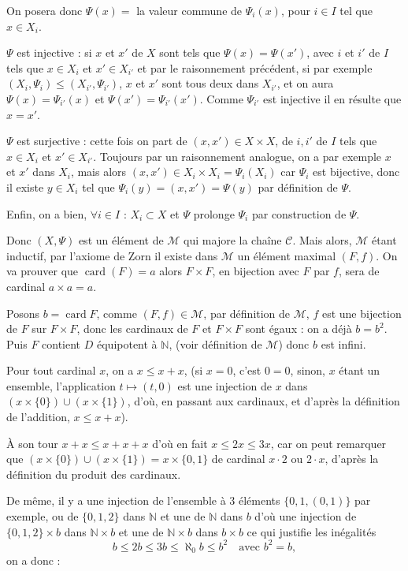 On posera donc $\Psi(x)=$ la valeur commune de $\Psi_i(x)$, pour $i\in I$ tel que $x\in X_i$.

$\Psi$ est injective : si $x$ et $x'$ de $X$ sont tels que $\Psi(x)=\Psi(x')$, avec $i$ et $i'$ de $I$ tels que $x\in X_i$ et $x'\in X_{i'}$ et par le raisonnement précédent, si par exemple $(X_i,\Psi_i)\le(X_{i'},\Psi_{i'})$, $x$ et $x'$ sont tous deux dans $X_{i'}$, et on aura $\Psi(x)=\Psi_{i'}(x)$ et $\Psi(x')=\Psi_{i'}(x')$. Comme $\Psi_{i'}$ est injective il en résulte que $x=x'$.

$\Psi$ est surjective : cette fois on part de $(x,x')\in X\times X$, de $i,i'$ de $I$ tels que $x\in X_i$ et $x'\in X_{i'}$. Toujours par un raisonnement analogue, on a par exemple $x$ et $x'$ dans $X_i$, mais alors $(x,x')\in X_i\times X_i=\Psi_i(X_i)$ car $\Psi_i$ est bijective, donc il existe $y\in X_i$ tel que $\Psi_i(y)=(x,x')=\Psi(y)$ par définition de $\Psi$.

Enfin, on a bien, $\forall i\in I$ : $X_i\subset X$ et $\Psi$ prolonge $\Psi_i$ par construction de $\Psi$.

Donc $(X,\Psi)$ est un élément de $\mathcal M$ qui majore la chaîne $\mathcal C$. Mais alors, $\mathcal M$ étant inductif, par l'axiome de Zorn il existe dans $\mathcal M$ un élément maximal $(F,f)$. On va prouver que $\operatorname{card}(F)=a$ alors $F\times F$, en bijection avec $F$ par $f$, sera de cardinal $a\times a=a$.

Posons $b=\operatorname{card}F$, comme $(F,f)\in\mathcal M$, par définition de $\mathcal M$, $f$ est une bijection de $F$ sur $F\times F$, donc les cardinaux de $F$ et $F\times F$ sont égaux : on a déjà $b=b^2$. Puis $F$ contient $D$ équipotent à $\mathbb N$, (voir définition de $\mathcal M$) donc $b$ est infini.

Pour tout cardinal $x$, on a $x\le x+x$, (si $x=0$, c'est $0=0$, sinon, $x$ étant un ensemble, l'application $t\mapsto(t,0)$ est une injection de $x$ dans $(x\times\{0\})\cup(x\times\{1\})$, d'où, en passant aux cardinaux, et d'après la définition de l'addition, $x\le x+x$).

À son tour $x+x\le x+x+x$ d'où en fait $x\le2x\le3x$, car on peut remarquer que $(x\times\{0\})\cup(x\times\{1\})=x\times\{0,1\}$ de cardinal $x\cdot2$ ou $2\cdot x$, d'après la définition du produit des cardinaux.

De même, il y a une injection de l'ensemble à 3 éléments $\{0,1,(0,1)\}$ par exemple, ou de $\{0,1,2\}$ dans $\mathbb N$ et une de $\mathbb N$ dans $b$ d'où une injection de $\{0,1,2\}\times b$ dans $\mathbb N\times b$ et une de $\mathbb N\times b$ dans $b\times b$ ce qui justifie les inégalités
\[
b\le2b\le3b\le\aleph_0b\le b^2\quad\text{avec }b^2=b,
\]
on a donc :

